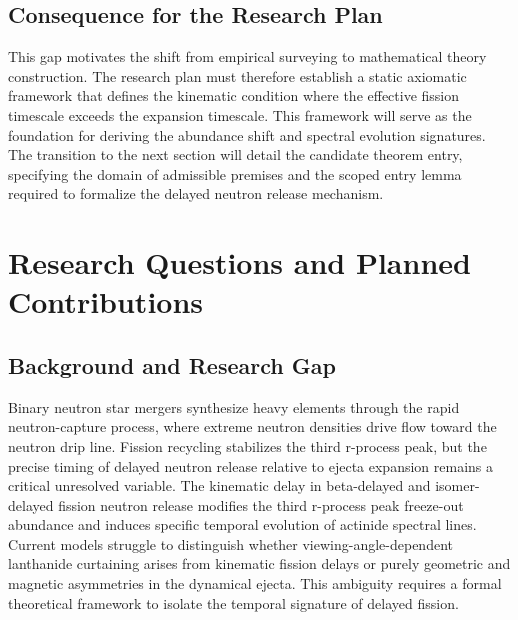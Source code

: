 \documentclass[conference]{IEEEtran}
\begin{document}
\subsection{Consequence for the Research Plan}
This gap motivates the shift from empirical surveying to mathematical theory construction. The research plan must therefore establish a static axiomatic framework that defines the kinematic condition where the effective fission timescale exceeds the expansion timescale. This framework will serve as the foundation for deriving the abundance shift and spectral evolution signatures. The transition to the next section will detail the candidate theorem entry, specifying the domain of admissible premises and the scoped entry lemma required to formalize the delayed neutron release mechanism.~\cite{cite_0247e311d8727a8e}

\section{Research Questions and Planned Contributions}
\subsection{Background and Research Gap}
Binary neutron star mergers synthesize heavy elements through the rapid neutron-capture process, where extreme neutron densities drive flow toward the neutron drip line. Fission recycling stabilizes the third r-process peak, but the precise timing of delayed neutron release relative to ejecta expansion remains a critical unresolved variable. The kinematic delay in beta-delayed and isomer-delayed fission neutron release modifies the third r-process peak freeze-out abundance and induces specific temporal evolution of actinide spectral lines. Current models struggle to distinguish whether viewing-angle-dependent lanthanide curtaining arises from kinematic fission delays or purely geometric and magnetic asymmetries in the dynamical ejecta. This ambiguity requires a formal theoretical framework to isolate the temporal signature of delayed fission.~\cite{cite_07d6df5d6978a1fc,cite_30c88fe46f23448d,cite_612290131318c0d4}
\end{document}

